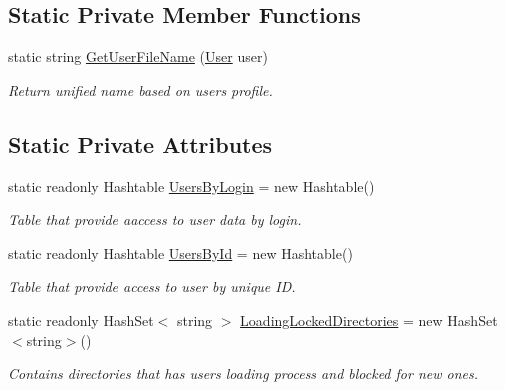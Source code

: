 \subsection*{Static Private Member Functions}
\begin{DoxyCompactItemize}
\item 
static string \mbox{\hyperlink{class_authority_controller_1_1_a_p_i_1_1_users_ac0cc8d945690970c7bac5432fb9baf11}{Get\+User\+File\+Name}} (\mbox{\hyperlink{class_authority_controller_1_1_data_1_1_personal_1_1_user}{User}} user)
\begin{DoxyCompactList}\small\item\em Return unified name based on user\textquotesingle{}s profile. \end{DoxyCompactList}\end{DoxyCompactItemize}
\subsection*{Static Private Attributes}
\begin{DoxyCompactItemize}
\item 
static readonly Hashtable \mbox{\hyperlink{class_authority_controller_1_1_a_p_i_1_1_users_a7e3706be7a0bf67293b57287db85c86f}{Users\+By\+Login}} = new Hashtable()
\begin{DoxyCompactList}\small\item\em Table that provide aaccess to user data by login. \end{DoxyCompactList}\item 
static readonly Hashtable \mbox{\hyperlink{class_authority_controller_1_1_a_p_i_1_1_users_a579a2f121cc7b767fbcd33279121e2ed}{Users\+By\+Id}} = new Hashtable()
\begin{DoxyCompactList}\small\item\em Table that provide access to user by unique ID. \end{DoxyCompactList}\item 
static readonly Hash\+Set$<$ string $>$ \mbox{\hyperlink{class_authority_controller_1_1_a_p_i_1_1_users_aed715cb6e26d7333f4ae338413460321}{Loading\+Locked\+Directories}} = new Hash\+Set$<$string$>$()
\begin{DoxyCompactList}\small\item\em Contains directories that has users loading process and blocked for new ones. \end{DoxyCompactList}\end{DoxyCompactItemize}


